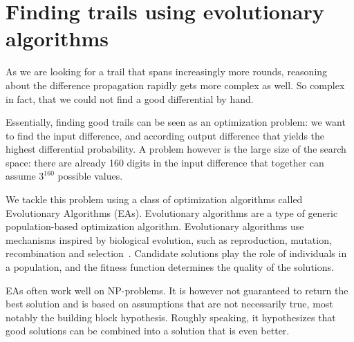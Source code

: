 \documentclass{report}
\begin{document}
\section{Finding trails using evolutionary algorithms}
As we are looking for a trail that spans increasingly more rounds, reasoning about the difference propagation rapidly gets more complex as well. So complex in fact, that we could not find a good differential by hand.

Essentially, finding good trails can be seen as an optimization problem: we want to find the input difference, and according output difference that yields the highest differential probability.
A problem however is the large size of the search space: there are already 160 digits in the input difference that together can assume $3^{160}$ possible values.

We tackle this problem using a class of optimization algorithms called Evolutionary Algorithms (EAs).
Evolutionary algorithms are a type of generic population-based optimization algorithm. Evolutionary algorithms use mechanisms inspired by biological evolution, such as reproduction, mutation, recombination and selection~\cite{back1996evolutionary}. Candidate solutions play the role of individuals in a population, and the fitness function determines the quality of the solutions.

EAs often work well on NP-problems.
It is however not guaranteed to return the best solution and is based on assumptions that are not necessarily true, most notably the building block hypothesis. Roughly speaking, it hypothesizes that good solutions can be combined into a solution that is even better.
\end{document}

